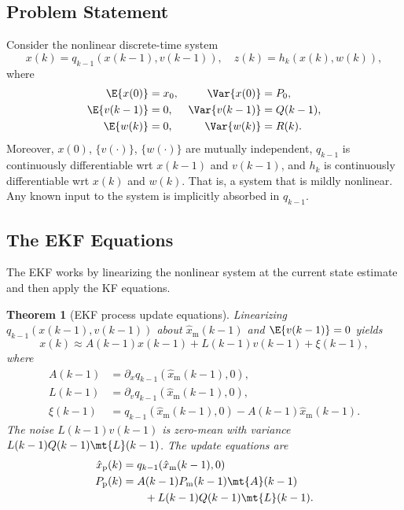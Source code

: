 \documentclass[]{hsrzf}
\theoremstyle{plain}
\newtheorem{thm}{Theorem}[section]
\theoremstyle{definition}
\theoremstyle{remark}
\begin{document}
\subsection{Problem Statement}

Consider the nonlinear discrete-time system
\[
  x(k) = q_{k-1}(x(k-1), v(k-1)), 
  \quad z(k) = h_k(x(k), w(k)),
\]
where
\begin{align*}
  \E{x(0)} &= x_0, & \Var{x(0)} &= P_0, \\
  \E{v(k-1)} &= 0, & \Var{v(k-1)} &= Q(k-1), \\
  \E{w(k)} &= 0, & \Var{w(k)} &= R(k).
\end{align*}
Moreover, $x(0)$, $\{v(\cdot)\}$, $\{w(\cdot)\}$ are mutually independent,
$q_{k-1}$ is continuously differentiable wrt $x(k-1)$ and $v(k-1)$, and
$h_{k}$ is continuously differentiable wrt $x(k)$ and $w(k)$. That is, a
system that is mildly nonlinear. Any known input to the system is implicitly
absorbed in $q_{k-1}$.

\subsection{The EKF Equations}

The EKF works by linearizing the nonlinear system at the current state
estimate and then apply the KF equations.


\begin{thm}[EKF process update equations]
  Linearizing $q_{k-1}(x(k-1), v(k-1))$ about $\hat{x}_\mathrm{m}(k-1)$
  and \allowbreak$\E{v(k-1)} = 0$ yields
  \[
    x(k) \approx A(k-1) x(k-1) + L(k-1) v(k-1) + \xi(k-1),
  \]
  where
  \begin{align*}
    A(k-1) &= \partial_x q_{k-1}(\hat{x}_\mathrm{m}(k-1), 0), \\
    L(k-1) &= \partial_v q_{k-1}(\hat{x}_\mathrm{m}(k-1), 0), \\
    \xi(k-1) &= q_{k-1}(\hat{x}_\mathrm{m}(k-1),0) -
    A(k-1)\hat{x}_\mathrm{m}(k-1).
  \end{align*}
  The noise $L(k-1)v(k-1)$ is zero-mean with variance
  $L(k-1)Q(k-1)\mt{L}(k-1)$. The update equations are
  \begin{align*}
    \hat{x}_\mathrm{p}(k) &= q_{k-1}(\hat{x}_\mathrm{m}(k-1), 0) \\
    P_\mathrm{p}(k) &= A(k-1) P_\mathrm{m}(k-1) \mt{A}(k-1) \\
      &\qquad + L(k-1) Q(k-1) \mt{L}(k-1).
  \end{align*}
\end{thm}
\end{document}
